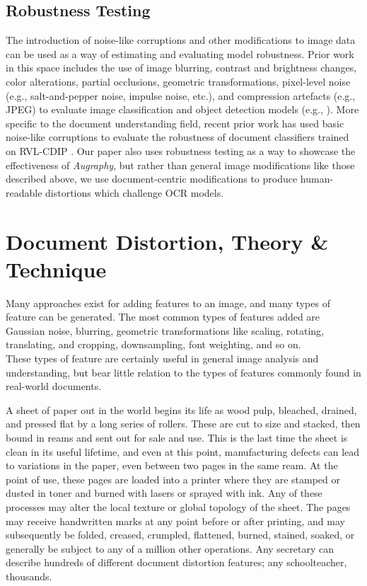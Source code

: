 \documentclass[runningheads]{llncs}
\begin{document}
\subsection{Robustness Testing}

The introduction of noise-like corruptions and other modifications to image data can be used as a way of estimating and evaluating model robustness.
Prior work in this space includes the use of image blurring, contrast and brightness changes, color alterations, partial occlusions, geometric transformations, pixel-level noise (e.g., salt-and-pepper noise, impulse noise, etc.), and compression artefacts (e.g., JPEG) to evaluate image classification and object detection models (e.g., \cite{image-quality-impact,imagenet-c,pathology-recommendations,Hosseini2017-kn-google-api,face-recognition-impact,pathology-schomig,Vasiljevic2016-al-bluring-impact}).
More specific to the document understanding field, recent prior work has used basic noise-like corruptions to evaluate the robustness of document classifiers trained on RVL-CDIP \cite{saifullah-2022}.
Our paper also uses robustness testing as a way to showcase the effectiveness of \emph{Augraphy}, but rather than general image modifications like those described above, we use document-centric modifications to produce human-readable distortions which challenge OCR models.

\section{Document Distortion, Theory \& Technique}
Many approaches exist for adding features to an image, and many types of feature can be generated. The most common types of features added are Gaussian noise, blurring, geometric transformations like scaling, rotating, translating, and cropping, downsampling, font weighting, and so on.\\

These types of feature are certainly useful in general image analysis and understanding, but bear little relation to the types of features commonly found in real-world documents.

A sheet of paper out in the world begins its life as wood pulp, bleached, drained, and pressed flat by a long series of rollers. These are cut to size and stacked, then bound in reams and sent out for sale and use. This is the last time the sheet is clean in its useful lifetime, and even at this point, manufacturing defects can lead to variations in the paper, even between two pages in the same ream. At the point of use, these pages are loaded into a printer where they are stamped or dusted in toner and burned with lasers or sprayed with ink. Any of these processes may alter the local texture or global topology of the sheet. The pages may receive handwritten marks at any point before or after printing, and may subsequently be folded, creased, crumpled, flattened, burned, stained, soaked, or generally be subject to any of a million other operations. Any secretary can describe hundreds of different document distortion features; any schoolteacher, thousands.\\
\end{document}
